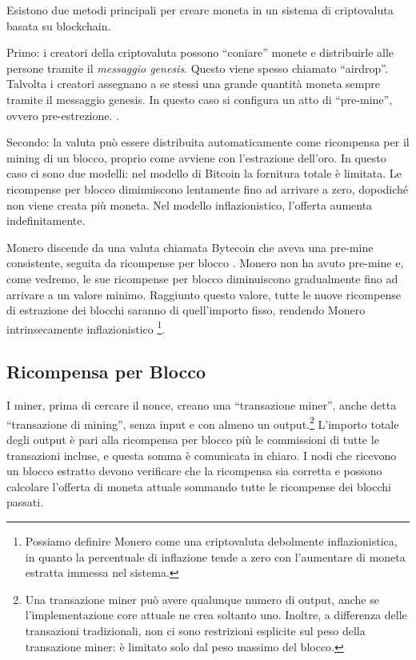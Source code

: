 Esistono due metodi principali per creare moneta in un sistema di criptovaluta basata su blockchain.

Primo: i creatori della criptovaluta possono “coniare” monete e distribuirle alle persone tramite il \emph{messaggio genesis}. Questo viene spesso chiamato “airdrop”. Talvolta i creatori assegnano a se stessi una grande quantità moneta sempre tramite il messaggio genesis. In questo caso si configura un atto di “pre-mine”, ovvero pre-estrezione. \cite{premine-description}.

Secondo: la valuta può essere distribuita automaticamente come ricompensa per il mining di un blocco, proprio come avviene con l’estrazione dell’oro. In questo caso ci sono due modelli: nel modello di Bitcoin la fornitura totale è limitata. Le ricompense per blocco diminuiscono lentamente fino ad arrivare a zero, dopodiché non viene creata più moneta. Nel modello inflazionistico, l’offerta aumenta indefinitamente.

Monero discende da una valuta chiamata Bytecoin che aveva una pre-mine consistente, seguita da ricompense per blocco \cite{monero-history}. Monero non ha avuto pre-mine e, come vedremo, le sue ricompense per blocco diminuiscono gradualmente fino ad arrivare a un valore minimo. Raggiunto questo valore, tutte le nuove ricompense di estrazione dei blocchi saranno di quell'importo fisso, rendendo Monero intrinsecamente inflazionistico \footnote{Possiamo definire Monero come una criptovaluta debolmente inflazionistica, in quanto la percentuale di inflazione tende a zero con l'aumentare di moneta estratta immessa nel sistema.}.


\subsection{Ricompensa per Blocco}
\label{subsec:block-reward} %

I miner, prima di cercare il nonce, creano una “transazione miner”, anche detta “transazione di mining”, senza input e con almeno un output.\footnote{Una transazione miner può avere qualunque numero di output, anche se l’implementazione core attuale ne crea soltanto uno. Inoltre, a differenza delle transazioni tradizionali, non ci sono restrizioni esplicite sul peso della transazione miner: è limitato solo dal peso massimo del blocco.} L’importo totale degli output è pari alla ricompensa per blocco più le commissioni di tutte le transazioni incluse, e questa somma è comunicata in chiaro. I nodi che ricevono un blocco estratto devono verificare che la ricompensa sia corretta e possono calcolare l’offerta di moneta attuale sommando tutte le ricompense dei blocchi passati.

